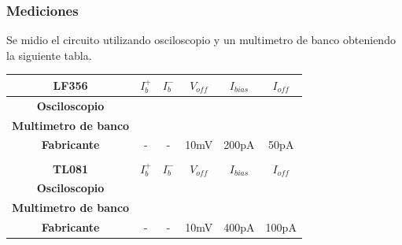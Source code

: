 \subsubsection{Mediciones}
Se midio el circuito utilizando osciloscopio y un multimetro de banco  obteniendo la siguiente tabla.
\begin{table}[H]
\begin{tabular}{cccccc}
\hline
\multicolumn{1}{|c|}{\textbf{LF356}}               & \multicolumn{1}{c|}{\textbf{$I_b^+$}} & \multicolumn{1}{c|}{\textbf{$I_b^-$}} & \multicolumn{1}{c|}{\textbf{$V_{off}$}} & \multicolumn{1}{c|}{\textbf{$I_{bias}$}} & \multicolumn{1}{c|}{\textbf{$I_{off}$}} \\ \hline
\multicolumn{1}{|c|}{\textbf{Osciloscopio}}        & \multicolumn{1}{c|}{}                 & \multicolumn{1}{c|}{}                 & \multicolumn{1}{c|}{}                   & \multicolumn{1}{c|}{}                    & \multicolumn{1}{c|}{}                   \\ \hline
\multicolumn{1}{|c|}{\textbf{Multimetro de banco}} & \multicolumn{1}{c|}{}                 & \multicolumn{1}{c|}{}                 & \multicolumn{1}{c|}{}                   & \multicolumn{1}{c|}{}                    & \multicolumn{1}{c|}{}                   \\ \hline
\multicolumn{1}{|c|}{\textbf{Fabricante}}          & \multicolumn{1}{c|}{-}                & \multicolumn{1}{c|}{-}                & \multicolumn{1}{c|}{10mV}               & \multicolumn{1}{c|}{200pA}               & \multicolumn{1}{c|}{50pA}               \\ \hline
\textbf{}                                          & \textbf{}                             & \textbf{}                             & \textbf{}                               & \textbf{}                                & \textbf{}                               \\ \hline
\multicolumn{1}{|c|}{\textbf{TL081}}               & \multicolumn{1}{c|}{\textbf{$I_b^+$}} & \multicolumn{1}{c|}{\textbf{$I_b^-$}} & \multicolumn{1}{c|}{\textbf{$V_{off}$}} & \multicolumn{1}{c|}{\textbf{$I_{bias}$}} & \multicolumn{1}{c|}{\textbf{$I_{off}$}} \\ \hline
\multicolumn{1}{|c|}{\textbf{Osciloscopio}}        & \multicolumn{1}{c|}{}                 & \multicolumn{1}{c|}{}                 & \multicolumn{1}{c|}{}                   & \multicolumn{1}{c|}{}                    & \multicolumn{1}{c|}{}                   \\ \hline
\multicolumn{1}{|c|}{\textbf{Multimetro de banco}} & \multicolumn{1}{c|}{}                 & \multicolumn{1}{c|}{}                 & \multicolumn{1}{c|}{}                   & \multicolumn{1}{c|}{}                    & \multicolumn{1}{c|}{}                   \\ \hline
\multicolumn{1}{|c|}{\textbf{Fabricante}}          & \multicolumn{1}{c|}{-}                & \multicolumn{1}{c|}{-}                & \multicolumn{1}{c|}{10mV}               & \multicolumn{1}{c|}{400pA}               & \multicolumn{1}{c|}{100pA}              \\ \hline
\end{tabular}
\end{table}

